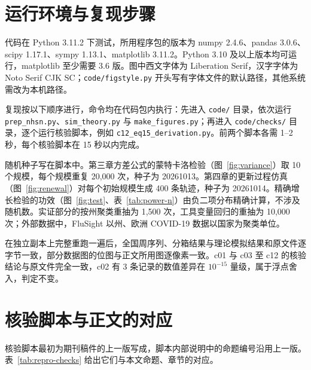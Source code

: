 \section{运行环境与复现步骤}
\label{app:repro-steps}

代码在 Python 3.11.2 下测试，所用程序包的版本为 numpy 2.4.6、pandas 3.0.6、scipy 1.17.1、sympy 1.13.1、matplotlib 3.11.2。Python 3.10 及以上版本均可运行，matplotlib 至少需要 3.6 版。图中西文字体为 Liberation Serif，汉字字体为 Noto Serif CJK SC；\nolinkurl{code/figstyle.py} 开头写有字体文件的默认路径，其他系统需改为本机路径。

复现按以下顺序进行，命令均在代码包内执行：先进入 \nolinkurl{code/} 目录，依次运行 \nolinkurl{prep_nhsn.py}、\nolinkurl{sim_theory.py} 与 \nolinkurl{make_figures.py}；再进入 \nolinkurl{code/checks/} 目录，逐个运行核验脚本，例如 \nolinkurl{c12_eq15_derivation.py}。前两个脚本各需 1--2 秒，每个核验脚本在 15 秒以内完成。

随机种子写在脚本中。第三章方差公式的蒙特卡洛检验（图~\ref{fig:variance}）取 10 个规模，每个规模重复 20,000 次，种子为 20261013。第四章的更新过程仿真（图~\ref{fig:renewal}）对每个初始规模生成 400 条轨迹，种子为 20261014。精确增长检验的功效（图~\ref{fig:test}、表~\ref{tab:power-n}）由负二项分布精确计算，不涉及随机数。实证部分的按州聚类重抽为 1,500 次，工具变量回归的重抽为 10,000 次；外部数据中，FluSight 以州、欧洲 COVID-19 数据以国家为聚类单位。

在独立副本上完整重跑一遍后，全国周序列、分箱结果与理论模拟结果和原文件逐字节一致，部分数据图的位图与正文所用图逐像素一致。c01 与 c03 至 c12 的核验结论与原文件完全一致，c02 有 3 条记录的数值差异在 $10^{-15}$ 量级，属于浮点舍入，判定不变。

\section{核验脚本与正文的对应}
\label{app:repro-checks}

核验脚本最初为期刊稿件的上一版写成，脚本内部说明中的命题编号沿用上一版。表~\ref{tab:repro-checks} 给出它们与本文命题、章节的对应。

